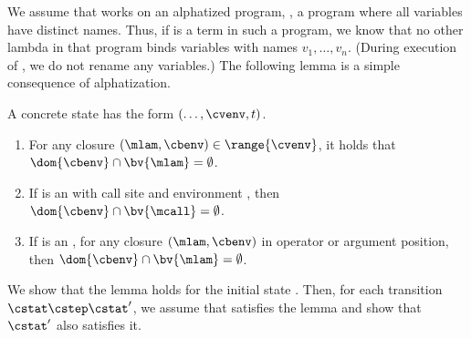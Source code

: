 \documentclass{LMCS}
\theoremstyle{definition} \newtheorem{property}[thm]{Property}
\begin{document}
We assume that \cfat{} works on an alphatized program, \ie, a program where all
variables have distinct names.
Thus, if \anylam{} is a term in such a program, we know that no other lambda in
that program binds variables with names $v_1, \dots, v_n$.
(During execution of \cfat, we do not rename any variables.)
The following lemma is a simple consequence of alphatization.
\begin{lem}\label{lem:envs-have-no-junk}
A concrete state \cstat{} has the form $(\dots, \cvenv, t)$.
\begin{enumerate}[\em(1)]
\item
  For any closure $(\mlam, \cbenv) \in \range{\cvenv}$, it holds that 
  $\dom{\cbenv} \cap \bv{\mlam} = \emptyset$.
\item
  If \cstat{} is an \deval{} with call site \mcall{} and environment 
  \cbenv, then $\dom{\cbenv} \cap \bv{\mcall} = \emptyset$.
\item
  If \cstat{} is an \dapply, for any closure $(\mlam, \cbenv)$ in operator or 
  argument position, then $\dom{\cbenv} \cap \bv{\mlam} = \emptyset$.
\end{enumerate}
\end{lem}
\proof
We show that the lemma holds for the initial state \initstate.
Then, for each transition $\cstat \cstep \cstat'$, we assume that \cstat{} 
satisfies the lemma and show that $\cstat'$ also satisfies it.
\end{document}

